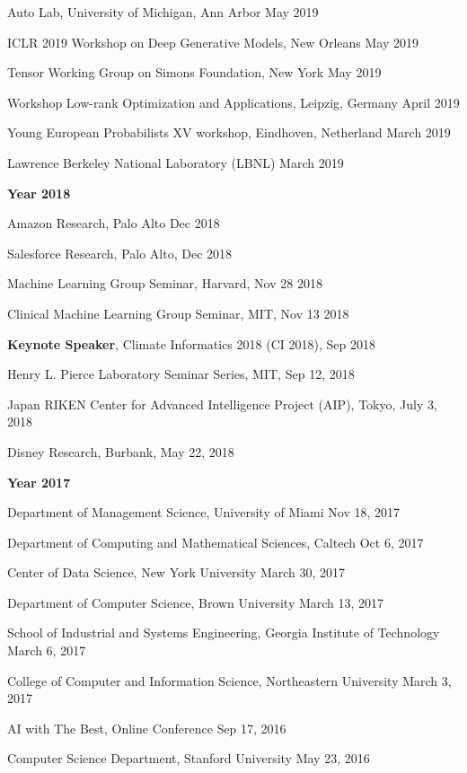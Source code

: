 \documentclass[margin,line]{res}
\begin{document}
\begin{resume}
Auto Lab, University of Michigan, Ann Arbor  \hfill{May 2019}

ICLR 2019 Workshop on Deep Generative Models, New Orleans  \hfill{May 2019}

Tensor Working Group  on Simons Foundation, New York  \hfill{May  2019}

Workshop Low-rank Optimization and Applications,  Leipzig, Germany \hfill{April 2019}

 Young European Probabilists XV workshop, Eindhoven, Netherland  \hfill{March 2019}
 
 Lawrence Berkeley National Laboratory (LBNL) \hfill{March 2019}

 {\bf Year  2018}
 
Amazon Research, Palo Alto \hfill{Dec 2018}

Salesforce Research, Palo Alto, \hfill{Dec 2018}

Machine Learning Group Seminar, Harvard, \hfill {Nov 28 2018} 

Clinical Machine Learning Group Seminar, MIT, \hfill {Nov 13  2018} 


\textbf{Keynote Speaker},  Climate Informatics 2018 (CI 2018), \hfill {Sep 2018} 


Henry L. Pierce Laboratory Seminar Series, MIT, \hfill {Sep 12, 2018}

Japan RIKEN  Center for Advanced Intelligence Project (AIP), Tokyo, \hfill {July 3, 2018}

Disney Research, Burbank, \hfill {May 22, 2018}

 {\bf Year  2017}
 
Department of Management Science,  University of Miami  \hfill {Nov 18, 2017}


Department of Computing and Mathematical Sciences,  Caltech  \hfill {Oct 6, 2017}


Center of Data Science, New York University  \hfill {March 30, 2017}


Department of Computer Science, Brown University   \hfill {March 13, 2017}



School of Industrial and Systems Engineering, Georgia Institute of Technology  \hfill {March 6, 2017}


College of Computer and Information Science, Northeastern University  \hfill {March 3, 2017}


 
 AI with The Best, Online Conference \hfill {Sep 17, 2016}
 
 
Computer Science Department,  Stanford University  \hfill {May 23, 2016}
 

\end{resume}
\end{document}
